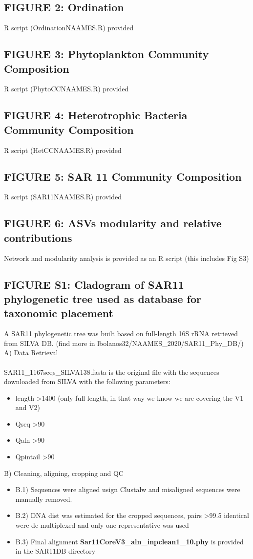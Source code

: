 \documentclass{article}
\begin{document}
\subsection{FIGURE 2: Ordination}
R script (OrdinationNAAMES.R) provided 
\subsection{FIGURE 3: Phytoplankton Community Composition}
R script (PhytoCCNAAMES.R) provided 
\subsection{FIGURE 4: Heterotrophic Bacteria Community Composition}
R script (HetCCNAAMES.R) provided 
\subsection{FIGURE 5: SAR 11 Community Composition}
R script (SAR11NAAMES.R) provided 
\subsection{FIGURE 6: ASVs modularity and relative contributions}
Network and modularity analysis is provided as an R script (this includes Fig S3)
\subsection{FIGURE S1: Cladogram of SAR11 phylogenetic tree used as database for taxonomic placement}

A SAR11 phylogenetic tree was built based on full-length 16S rRNA retrieved from SILVA DB. (find more in lbolanos32/NAAMES\_2020/SAR11\_Phy\_DB/) \\

A) Data Retrieval \\
\\
SAR11\_1167seqs\_SILVA138.fasta is the original file with the sequences downloaded from SILVA with the following parameters:
\begin{itemize}
\item length \textgreater 1400 (only full length, in that way we know we are covering the V1 and V2)
\item Qseq \textgreater 90
\item Qaln \textgreater 90
\item Qpintail \textgreater 90
\end{itemize}

B) Cleaning, aligning, cropping and QC
\begin{itemize}
\item B.1) Sequences were aligned usign Clustalw and misaligned sequences were manually removed. 
\item B.2) DNA dist was estimated for the cropped sequences, pairs  \textgreater 99.5 identical were de-multiplexed and only one representative was used
\item B.3) Final alignment \textbf{Sar11CoreV3\_aln\_inpclean1\_10.phy} is provided in the SAR11DB directory
\end {itemize}
\end{document}
